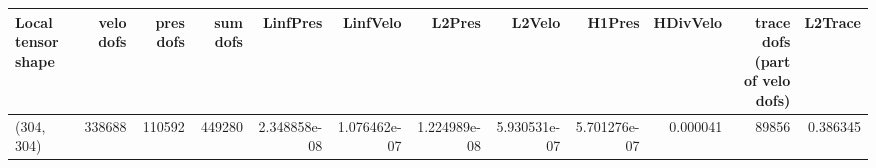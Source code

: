 \begin{tabular}{lrrrrrrrrrrr}
\toprule
Local tensor shape &  velo dofs &  pres dofs &  sum dofs &     LinfPres &     LinfVelo &       L2Pres &       L2Velo &       H1Pres &  HDivVelo &  trace dofs (part of velo dofs) &  L2Trace \\
\midrule
        (304, 304) &     338688 &     110592 &    449280 & 2.348858e-08 & 1.076462e-07 & 1.224989e-08 & 5.930531e-07 & 5.701276e-07 &  0.000041 &                           89856 & 0.386345 \\
\bottomrule
\end{tabular}
